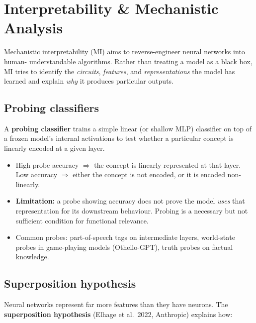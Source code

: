 
\section{Interpretability \& Mechanistic Analysis}

Mechanistic interpretability (MI) aims to reverse-engineer neural networks into human-
understandable algorithms. Rather than treating a model as a black box, MI tries to
identify the \emph{circuits}, \emph{features}, and \emph{representations} the model
has learned and explain \emph{why} it produces particular outputs.

\subsection{Probing classifiers}

A \textbf{probing classifier} trains a simple linear (or shallow MLP) classifier on top
of a frozen model's internal activations to test whether a particular concept is linearly
encoded at a given layer.

\begin{itemize}
  \item High probe accuracy $\Rightarrow$ the concept is linearly represented at that
    layer. Low accuracy $\Rightarrow$ either the concept is not encoded, or it is encoded
    non-linearly.
  \item \textbf{Limitation:} a probe showing accuracy does not prove the model
    \emph{uses} that representation for its downstream behaviour. Probing is a
    necessary but not sufficient condition for functional relevance.
  \item Common probes: part-of-speech tags on intermediate layers, world-state probes
    in game-playing models (Othello-GPT), truth probes on factual knowledge.
\end{itemize}

\subsection{Superposition hypothesis}

Neural networks represent far more features than they have neurons. The
\textbf{superposition hypothesis} (Elhage et al.\ 2022, Anthropic) explains how:

